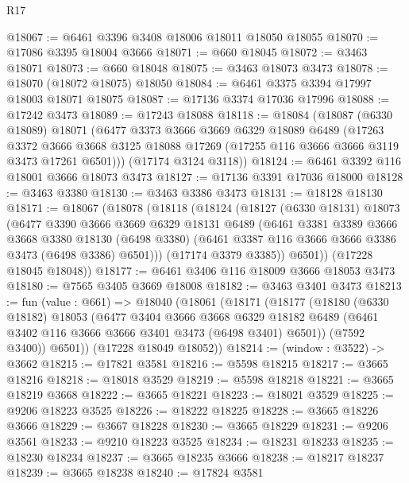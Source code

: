 \begin{lexlean}{R17}
\begin{coremodule}
@18067 := @6461 @3396 @3408 @18006 @18011 @18050 @18055
@18070 := @17086 @3395 @18004 @3666
@18071 := @660 @18045
@18072 := @3463 @18071
@18073 := @660 @18048
@18075 := @3463 @18073 @3473
@18078 := @18070 (@18072 @18075) @18050
@18084 := @6461 @3375 @3394 @17997 @18003 @18071 @18075
@18087 := @17136 @3374 @17036 @17996
@18088 := @17242 @3473
@18089 := @17243 @18088
@18118 := @18084
    (@18087
      (@6330 @18089)
      @18071
      (@6477
        @3373
        @3666
        @3669
        @6329
        @18089
        @6489
        (@17263
          @3372
          @3666
          @3668
          @3125
          @18088
          @17269
          (@17255 @116 @3666 @3666 @3119 @3473 @17261 @6501)))
      (@17174 @3124 @3118))
@18124 := @6461 @3392 @116 @18001 @3666 @18073 @3473
@18127 := @17136 @3391 @17036 @18000
@18128 := @3463 @3380
@18130 := @3463 @3386 @3473
@18131 := @18128 @18130
@18171 := @18067
    (@18078
      (@18118
        (@18124
          (@18127
            (@6330 @18131)
            @18073
            (@6477
              @3390
              @3666
              @3669
              @6329
              @18131
              @6489
              (@6461
                @3381
                @3389
                @3666
                @3668
                @3380
                @18130
                (@6498 @3380)
                (@6461 @3387 @116 @3666 @3666 @3386 @3473 (@6498 @3386) @6501)))
            (@17174 @3379 @3385))
          @6501))
      (@17228 @18045 @18048))
@18177 := @6461 @3406 @116 @18009 @3666 @18053 @3473
@18180 := @7565 @3405 @3669 @18008
@18182 := @3463 @3401 @3473
@18213 := fun (value : @661) =>
  @18040
    (@18061
      (@18171
        (@18177
          (@18180
            (@6330 @18182)
            @18053
            (@6477
              @3404
              @3666
              @3668
              @6329
              @18182
              @6489
              (@6461 @3402 @116 @3666 @3666 @3401 @3473 (@6498 @3401) @6501))
            (@7592 @3400))
          @6501))
      (@17228 @18049 @18052))
@18214 := (window : @3522) -> @3662
@18215 := @17821 @3581
@18216 := @5598 @18215
@18217 := @3665 @18216
@18218 := @18018 @3529
@18219 := @5598 @18218
@18221 := @3665 @18219 @3668
@18222 := @3665 @18221
@18223 := @18021 @3529
@18225 := @9206 @18223 @3525
@18226 := @18222 @18225
@18228 := @3665 @18226 @3666
@18229 := @3667 @18228
@18230 := @3665 @18229
@18231 := @9206 @3561
@18233 := @9210 @18223 @3525
@18234 := @18231 @18233
@18235 := @18230 @18234
@18237 := @3665 @18235 @3666
@18238 := @18217 @18237
@18239 := @3665 @18238
@18240 := @17824 @3581

\end{coremodule}
\end{lexlean}
